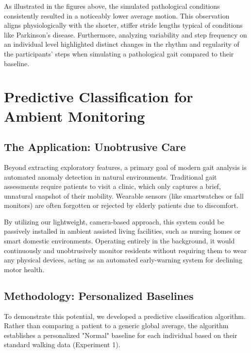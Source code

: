 \documentclass[12pt,a4paper]{article} %
\begin{document}
As illustrated in the figures above, the simulated pathological conditions consistently resulted in a noticeably lower average motion. This observation aligns physiologically with the shorter, stiffer stride lengths typical of conditions like Parkinson's disease. Furthermore, analyzing variability and step frequency on an individual level highlighted distinct changes in the rhythm and regularity of the participants' steps when simulating a pathological gait compared to their baseline.

\clearpage

\section{Predictive Classification for Ambient Monitoring}

\subsection{The Application: Unobtrusive Care}
Beyond extracting exploratory features, a primary goal of modern gait analysis is automated anomaly detection in natural environments. Traditional gait assessments require patients to visit a clinic, which only captures a brief, unnatural snapshot of their mobility. Wearable sensors (like smartwatches or fall monitors) are often forgotten or rejected by elderly patients due to discomfort. 

By utilizing our lightweight, camera-based approach, this system could be passively installed in ambient assisted living facilities, such as nursing homes or smart domestic environments. Operating entirely in the background, it would continuously and unobtrusively monitor residents without requiring them to wear any physical devices, acting as an automated early-warning system for declining motor health.

\subsection{Methodology: Personalized Baselines}
To demonstrate this potential, we developed a predictive classification algorithm. Rather than comparing a patient to a generic global average, the algorithm establishes a personalized "Normal" baseline for each individual based on their standard walking data (Experiment 1). 
\end{document}
